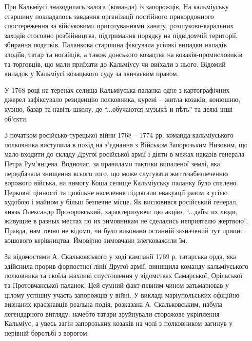 
При Кальміусі знаходилась залога (команда) із запорожців. На кальміуську
старшину покладалось завдання організації постійного прикордонного
спостереження за військовими приготуваннями ханату, розшуково-каральних заходів
стосовно розбійництва, підтримання порядку на підвідомчій території, збирання
податків. Паланкова старшина фіксувала усілякі випадки нападів злодіїв, татар
та ногайців, а також донського козацтва на козаків-промисловиків та торговців,
що мали приїхати до Кальміусу чи виїхали з нього. Відомий випадок у Кальміусі
козацького суду за звичаєвим правом. 

У 1768 році на теренах селища Кальміуська паланка одне з картографічних джерел
зафіксувало резиденцію полковника, курені – житла козаків, конюшню, кузню,
базар та навіть школу, де \enquote{...обучаются музыкѣ и пѣть} та деякі інші об'єкти.

З початком російсько-турецької війни 1768 – 1774 рр. команда кальміуського
полковника виступила в похід на з'єднання з Військом Запорозьким Низовим, що
мало входити до складу Другої російської армії і діяти в межах наказів генерала
Петра Рум'янцева. Водночас, за правилами тактики випаленої землі, яка
передбачала знищення всього того, що може слугувати життєзабезпеченню ворожого
війська, на вимогу Коша селище Кальміуську паланку було спалено. Церковні
цінності та цивільне населення підлягали евакуації разом з усією худобою і
майном у більш безпечне місце. Як висловився російський генерал, князь
Олександр Прозоровський, характеризуючи цю акцію, \enquote{...дабы их люди, живущие в
разных местах по их зимовникам не сделались неприятелю жертвою}. Правда, нам
точно не відомо, чи було виконано останній зазначений тут припис кошового
керівництва. Ймовірно зимовчани злегковажили їм.

За відомостями А. Скальковського у ході кампанії 1769 р. татарська орда, яка
здійснила прорив форпостної лінії Другої армії, винищила команду кальміуського
полковника та скоїла жахливі спустошення у відомствах Самарської, Орільської та
Протовчанської паланок. Цей сумний факт певним чином затьмарював у цілому
успішну участь запорожців у війні.  У викладі маріупольських офіційно визнаних
краєзнавців реальна подія, розказана А. Скальковським, набула легендарного
вигляду: начебто татари зруйнували сторожове укріплення Кальміус, а увесь загін
запорозьких козаків на чолі з полковником загинув у нерівній боротьбі з
ворогом. 

